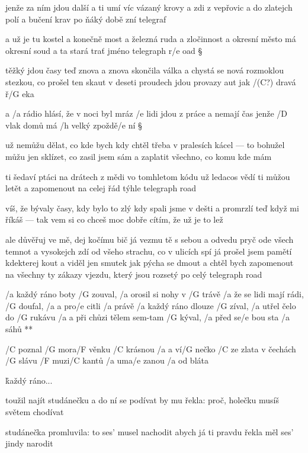 jenže za ním jdou další a ti umí víc
vázaný krovy a zdi z vepřovic
a do zlatejch polí a bučení krav
po ňáký době zní telegraf \s

a už je tu kostel a konečně most
a železná ruda a zločinnost
a okresní město má okresní soud
a ta stará trať jméno telegraph r/e oad \S

těžký jdou časy teď znova a znova
skončila válka a chystá se nová
rozmoklou stezkou, co prošel ten skaut
v deseti proudech jdou provazy aut
jak /(C?) dravá ř/G eka \s

a /a rádio hlásí, že v noci byl mráz
/e lidi jdou z práce a nemají čas
jenže /D vlak domů má /h velký zpoždě/e ní \S

už nemůžu dělat, co kde bych kdy chtěl
třeba v pralesích kácel --- to bohužel
můžu jen sklízet, co zasil jsem sám
a zaplatit všechno, co komu kde mám \s

ti šedaví ptáci na drátech z mědi
vo tomhletom kódu už ledacos vědí
ti můžou letět a zapomenout
na celej řád týhle telegraph road \songgg

víš, že bývaly časy, kdy bylo to zlý
kdy spali jsme v dešti a promrzlí
teď když mi říkáš --- tak vem si co chceš
moc dobře cítím, že už je to lež \s

ale důvěřuj ve mě, dej kočímu bič
já vezmu tě s sebou a odvedu pryč
ode všech temnot a vysokejch zdí
od všeho strachu, co v ulicích spí
já prošel jsem pamětí kdekterej kout
a viděl jen smutek jak pýcha se dmout
a chtěl bych zapomenout
na všechny ty zákazy vjezdu, který jsou rozsetý
po celý telegraph road





\R  /a každý ráno boty /G zouval,  /a orosil si nohy v /G trávě
    /a že se lidi mají rádi, /G doufal, /a a pro/e citli /a právě
    /a každý ráno dlouze /G zíval, /a utřel čelo do /G rukávu
    /a a při chůzi tělem sem-tam /G kýval, /a před se/e bou sta /a sáhů **

/C poznal /G mora/F věnku /C krásnou
/a a ví/G nečko /C ze zlata
v čechách /G slávu /F muzi/C kantů
/a uma/e zanou /a od bláta

\r  každý ráno...

toužil najít studánečku
a do ní se podívat
by mu řekla: proč, holečku
musíš světem chodívat \s

studánečka promluvila:
to ses' musel nachodit
abych já ti pravdu řekla
měl ses' jindy narodit

\rr



